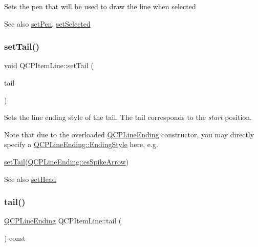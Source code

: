 Sets the pen that will be used to draw the line when selected

\begin{DoxySeeAlso}{See also}
\hyperlink{class_q_c_p_item_line_a572528dab61c1abe205822fbd5db4b27}{set\+Pen}, \hyperlink{class_q_c_p_abstract_item_a203de94ad586cc44d16c9565f49d3378}{set\+Selected} 
\end{DoxySeeAlso}
\mbox{\label{class_q_c_p_item_line_ac264222c3297a7efe33df9345c811a5f}} 
\subsubsection{\texorpdfstring{set\+Tail()}{setTail()}}
{\footnotesize\ttfamily void Q\+C\+P\+Item\+Line\+::set\+Tail (\begin{DoxyParamCaption}\item[{const \hyperlink{class_q_c_p_line_ending}{Q\+C\+P\+Line\+Ending} \&}]{tail }\end{DoxyParamCaption})}

Sets the line ending style of the tail. The tail corresponds to the {\itshape start} position.

Note that due to the overloaded \hyperlink{class_q_c_p_line_ending}{Q\+C\+P\+Line\+Ending} constructor, you may directly specify a \hyperlink{class_q_c_p_line_ending_a5ef16e6876b4b74959c7261d8d4c2cd5}{Q\+C\+P\+Line\+Ending\+::\+Ending\+Style} here, e.\+g.
\begin{DoxyCode}
\hyperlink{class_q_c_p_item_line_ac264222c3297a7efe33df9345c811a5f}{setTail}(\hyperlink{class_q_c_p_line_ending_a5ef16e6876b4b74959c7261d8d4c2cd5ab9964d0d03f812d1e79de15edbeb2cbf}{QCPLineEnding::esSpikeArrow}) 
\end{DoxyCode}


\begin{DoxySeeAlso}{See also}
\hyperlink{class_q_c_p_item_line_aebf3d687114d584e0459db6759e2c3c3}{set\+Head} 
\end{DoxySeeAlso}
\mbox{\label{class_q_c_p_item_line_ac085d3939ec11d7a4d592dc2ed578360}} 
\subsubsection{\texorpdfstring{tail()}{tail()}}
{\footnotesize\ttfamily \hyperlink{class_q_c_p_line_ending}{Q\+C\+P\+Line\+Ending} Q\+C\+P\+Item\+Line\+::tail (\begin{DoxyParamCaption}{ }\end{DoxyParamCaption}) const\hspace{0.3cm}{\ttfamily [inline]}}



